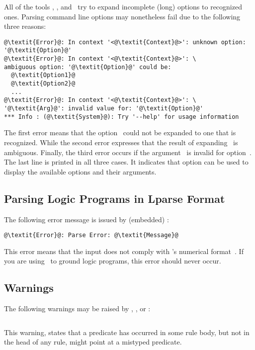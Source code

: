 All of the tools \gringo, \clasp, and \clingo\
try to expand incomplete (long) options to recognized ones.
Parsing command line options may nonetheless fail due to the following three reasons:
%
\begin{lstlisting}[numbers=none,escapechar=@]
@\textit{Error}@: In context '<@\textit{Context}@>': unknown option: '@\textit{Option}@'
@\textit{Error}@: In context '<@\textit{Context}@>': \
ambiguous option: '@\textit{Option}@' could be:
  @\textit{Option1}@
  @\textit{Option2}@
  ...
@\textit{Error}@: In context '<@\textit{Context}@>': \
'@\textit{Arg}@': invalid value for: '@\textit{Option}@'
*** Info : (@\textit{System}@): Try '--help' for usage information
\end{lstlisting}
%
The first error means that the option~
could not be expanded to one that is recognized.
While the second error expresses that the result of expanding~\code{\textit{Option}} is ambiguous.
Finally, the third error occurs if the argument~ is invalid for option~.
The last line is printed in all three cases.
It indicates that option \code{--help} can be used to display the available options and their arguments.

\subsection{Parsing Logic Programs in Lparse Format}\label{subsec:error:lparse}

The following error message is issued by (embedded) \clasp:
%
\begin{lstlisting}[numbers=none,escapechar=@]
@\textit{Error}@: Parse Error: @\textit{Message}@
\end{lstlisting}
%
This error means that the input does not comply with \lparse's numerical format~\cite{lparseManual}.
If you are using \gringo\ to ground logic programs,
this error should never occur.

\subsection{Warnings}\label{subsec:warn}

The following warnings may be raised by \gringo, \clingo, or \iclingo:
%
\begin{lstlisting}[numbers=none,escapechar=@]
% warning: @\textit{p}@/@\!\textit{i}@ is never defined
\end{lstlisting}
%
This warning, states that a predicate 
has occurred in some rule body, but not in the head of any rule,
might point at a mistyped predicate.

